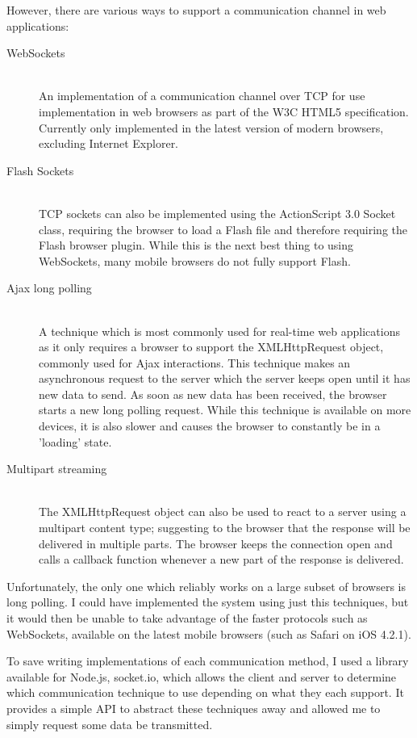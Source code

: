 \documentclass[a4papert,11pt,notitlepage]{ltxdoc}
\begin{document}
However, there are various ways to support a  communication channel in web applications:
\begin{description}
\item[WebSockets] \hfill \\
An implementation of a communication channel over TCP for use implementation in web browsers as part of the W3C HTML5 specification. Currently only implemented in the latest version of modern browsers, excluding Internet Explorer.
\item[Flash Sockets] \hfill \\
TCP sockets can also be implemented using the ActionScript 3.0 Socket class, requiring the browser to load a Flash file and therefore requiring the Flash browser plugin. While this is the next best thing to using WebSockets, many mobile browsers do not fully support Flash.
\item[Ajax long polling] \hfill \\
A technique which is most commonly used for real-time web applications as it only requires a browser to support the XMLHttpRequest object, commonly used for Ajax interactions. This technique makes an asynchronous request to the server which the server keeps open until it has new data to send. As soon as new data has been received, the browser starts a new long polling request. While this technique is available on more devices, it is also slower and causes the browser to constantly be in a 'loading' state.
\item[Multipart streaming] \hfill \\
The XMLHttpRequest object can also be used to react to a server using a multipart content type; suggesting to the browser that the response will be delivered in multiple parts. The browser keeps the connection open and calls a callback function whenever a new part of the response is delivered.
\end{description}

Unfortunately, the only one which reliably works on a large subset of browsers is long polling. I could have implemented the system using just this techniques, but it would then be unable to take advantage of the faster protocols such as WebSockets, available on the latest mobile browsers (such as Safari on iOS 4.2.1).

To save writing implementations of each communication method, I used a library available for Node.js, socket.io\cite{socketio:web}, which allows the client and server to determine which communication technique to use depending on what they each support. It provides a simple API to abstract these techniques away and allowed me to simply request some data be transmitted. 
\end{document}
